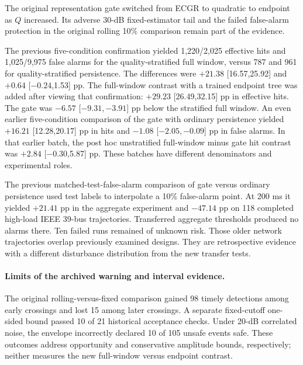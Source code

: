 \documentclass[10pt]{article}
\begin{document}
The original representation gate switched from ECGR to quadratic to endpoint as $Q$ increased. Its adverse 30-dB fixed-estimator tail and the failed false-alarm protection in the original rolling 10\% comparison remain part of the evidence.

The previous five-condition confirmation yielded 1,220/2,025 effective hits and 1,025/9,975 false alarms for the quality-stratified full window, versus 787 and 961 for quality-stratified persistence. The differences were $+21.38$ [16.57,25.92] and $+0.64$ [$-0.24$,1.53] pp. The full-window contrast with a trained endpoint tree was added after viewing that confirmation: $+29.23$ [26.49,32.15] pp in effective hits. The gate was $-6.57$ [$-9.31,-3.91$] pp below the stratified full window. An even earlier five-condition comparison of the gate with ordinary persistence yielded $+16.21$ [12.28,20.17] pp in hits and $-1.08$ [$-2.05,-0.09$] pp in false alarms. In that earlier batch, the post hoc unstratified full-window minus gate hit contrast was $+2.84$ [$-0.30$,5.87] pp. These batches have different denominators and experimental roles.

The previous matched-test-false-alarm comparison of gate versus ordinary persistence used test labels to interpolate a 10\% false-alarm point. At 200 ms it yielded $+21.41$ pp in the aggregate experiment and $-47.14$ pp on 118 completed high-load IEEE 39-bus trajectories. Transferred aggregate thresholds produced no alarms there. Ten failed runs remained of unknown risk. Those older network trajectories overlap previously examined designs. They are retrospective evidence with a different disturbance distribution from the new transfer tests.

\paragraph{Limits of the archived warning and interval evidence.}
The original rolling-versus-fixed comparison gained 98 timely detections among early crossings and lost 15 among later crossings. A separate fixed-cutoff one-sided bound passed 10 of 21 historical acceptance checks. Under 20-dB correlated noise, the envelope incorrectly declared 10 of 105 unsafe events safe. These outcomes address opportunity and conservative amplitude bounds, respectively; neither measures the new full-window versus endpoint contrast.
\end{document}
